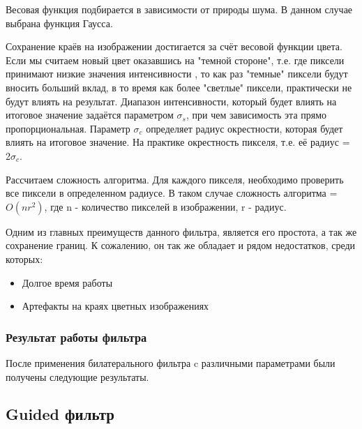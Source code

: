 Весовая функция подбирается в зависимости от природы шума. В данном случае выбрана функция Гаусса.

Сохранение краёв на изображении достигается за счёт весовой функции цвета. Если мы считаем новый цвет оказавшись на "темной стороне", т.е. где пиксели принимают низкие значения интенсивности , то как раз "темные" пиксели будут вносить больший вклад, в то время как более "светлые" пиксели, практически не будут влиять на результат. Диапазон интенсивности, который будет влиять на итоговое значение задаётся параметром $\sigma_s$,  при чем зависимость эта прямо пропорциональная.
Параметр $\sigma_c$ определяет радиус окрестности, которая будет влиять на итоговое значение. На практике окрестность пикселя, т.е. её радиус = 2$\sigma_c$.

Рассчитаем сложность алгоритма. Для каждого пикселя, необходимо проверить все пиксели в определенном радиусе. В таком случае сложность алгоритма = $O(nr^2)$, где n - количество пикселей в изображении, r - радиус. 

Одним из главных преимуществ данного фильтра, является его простота, а так же сохранение границ. К сожалению, он так же обладает и рядом недостатков, среди которых:

\begin{itemize}
	\item Долгое время работы
	\item Артефакты на краях цветных изображениях
\end{itemize}

\subsubsection{Результат работы фильтра}
После применения билатерального фильтра c различными параметрами были получены следующие результаты.

\begin{figure}[H]\label{img:bilRes}
	\begin{minipage}[H]{0.49\linewidth}
	\end{minipage}
	\begin{minipage}[H]{0.49\linewidth}
	\end{minipage}
\end{figure}


\subsection{Guided фильтр}
